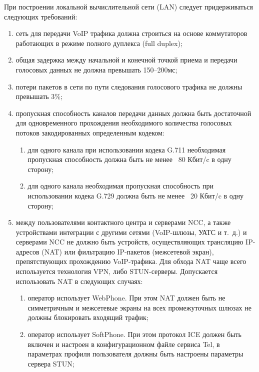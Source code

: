 При построении локальной вычислительной сети (LAN) следует придерживаться следующих требований:
\begin{enumerate}
    \item сеть для передачи VoIP трафика должна строиться на основе коммутаторов работающих в режиме полного дуплекса (full duplex);
    \item общая задержка между начальной и конечной точкой приема и передачи голосовых данных не должна превышать 150--200мс;
    \item потери пакетов в сети по пути следования голосового трафика не должны превышать 3\%;
    \item пропускная способность каналов передачи данных должна быть достаточной для одновременного прохождения необходимого количества голосовых потоков закодированных определенным кодеком:
    \begin{enumerate}
        \item для одного канала при использовании кодека G.711 необходимая пропускная способность должна быть не менее ~80 Кбит/c в одну сторону;
        \item для одного канала необходимая пропускная способность при использовании кодека G.729 должна быть не менее ~20 Кбит/c в одну сторону;
    \end{enumerate}
    \item между пользователями контактного центра и серверами NCC, а также устройствами интеграции с другими сетями (VoIP-шлюзы, УАТС и т.~д.) и серверами NCC не должно быть устройств, осуществляющих трансляцию IP-адресов (NAT) или фильтрацию IP-пакетов (межсетевой экран), препятствующих прохождению VoIP-трафика. Для обхода NAT чаще всего используется технология VPN, либо STUN-серверы. Допускается использовать NAT в следующих случаях:
    \begin{enumerate}
        \item оператор использует WebPhone. При этом NAT должен быть не симметричным и межсетевые экраны на всех промежуточных шлюзах не должны блокировать входящий трафик;
        \item оператор использует SoftPhone. При этом протокол ICE должен быть включен и настроен в конфигурационном файле сервиса Tel, в параметрах профиля пользователя должны быть настроены параметры сервера STUN;
    \end{enumerate}

\end{enumerate}
